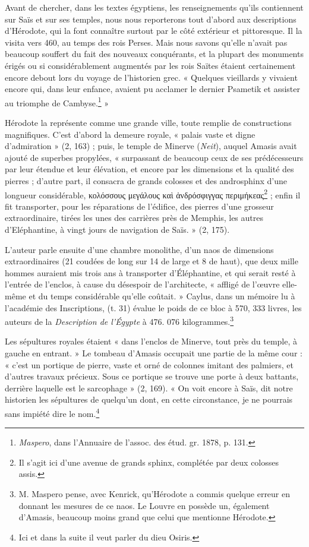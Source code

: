 \documentclass[a4paper, 11pt, oneside]{article}
\begin{document}
Avant de chercher, dans les textes égyptiens, les renseignements qu'ils contiennent sur Saïs et sur ses temples, nous nous reporterons tout d'abord aux descriptions d'Hérodote, qui la font connaître surtout par le côté extérieur et pittoresque. Il la visita vers 460, au temps des rois Perses. Mais nous savons qu'elle n'avait pas beaucoup souffert du fait des nouveaux conquérants, et la plupart des monuments érigés ou si considérablement augmentés par les rois Saïtes étaient certainement encore debout lors du voyage de l'historien grec. « Quelques vieillards y vivaient encore qui, dans leur enfance, avaient pu acclamer le dernier Psametik et assister au triomphe de Cambyse.\footnote{\emph{Maspero}, dans l'Annuaire de l'assoc. des étud. gr. 1878, p. 131.} »

Hérodote la représente comme une grande ville, toute remplie de constructions magnifiques. C'est d'abord la demeure royale, « palais vaste et digne d'admiration » (2, 163) ; puis, le temple de Minerve (\emph{Neit}), auquel Amasis avait ajouté de superbes propylées, « surpassant de beaucoup ceux de ses prédécesseurs par leur étendue et leur élévation, et encore par les dimensions et la qualité des pierres ; d'autre part, il consacra de grands colosses et des androsphinx d'une longueur considérable, κολόσσους μεγάλους καὶ ἀνδρόσφιγγας περιμήκεας\footnote{Il s'agit ici d'une avenue de grands sphinx, complétée par deux colosses assis.} ; enfin il fit transporter, pour les réparations de l'édifice, des pierres d'une grosseur extraordinaire, tirées les unes des carrières près de Memphis, les autres d'Eléphantine, à vingt jours de navigation de Saïs. » (2, 175).

L'auteur parle ensuite d'une chambre monolithe, d'un naos de dimensions extraordinaires (21 coudées de long sur 14 de large et 8 de haut), que deux mille hommes auraient mis trois ans à transporter d'Éléphantine, et qui serait resté à l'entrée de l'enclos, à cause du désespoir de l'architecte, « affligé de l'œuvre elle-même et du temps considérable qu'elle coûtait. » Caylus, dans un mémoire lu à l'académie des Inscriptions, (t. 31) évalue le poids de ce bloc à 570, 333 livres, les auteurs de la \emph{Description de l'Égypte} à 476. 076 kilogrammes.\footnote{M. Maspero pense, avec Kenrick, qu'Hérodote a commis quelque erreur en donnant les mesures de ce naos. Le Louvre en possède un, également d'Amasis, beaucoup moins grand que celui que mentionne Hérodote.}

Les sépultures royales étaient « dans l'enclos de Minerve, tout près du temple, à gauche en entrant. » Le tombeau d'Amasis occupait une partie de la même cour : « c'est un portique de pierre, vaste et orné de colonnes imitant des palmiers, et d'autres travaux précieux. Sous ce portique se trouve une porte à deux battants, derrière laquelle est le sarcophage » (2, 169). « On voit encore à Saïs, dit notre historien les sépultures de quelqu'un dont, en cette circonstance, je ne pourrais sans impiété dire le nom.\footnote{Ici et dans la suite il veut parler du dieu Osiris.}
\end{document}
